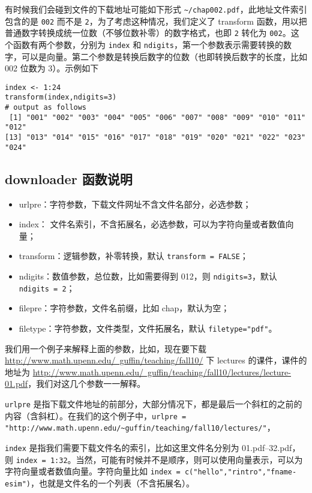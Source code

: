 \documentclass{article}
\begin{document}
有时候我们会碰到文件的下载地址可能如下形式 \lstinline{~/chap002.pdf}，此地址文件索引包含的是 \lstinline{002} 而不是 \lstinline{2}，为了考虑这种情况，我们定义了 \textsf{transform} 函数，用以把普通数字转换成统一位数（不够位数补零）的数字格式，也即 \lstinline{2} 转化为 \lstinline{002}。这个函数有两个参数，分别为 \lstinline{index} 和 \lstinline{ndigits}，第一个参数表示需要转换的数字，可以是向量。第二个参数是转换后数字的位数（也即转换后数字的长度，比如 002 位数为 3）。示例如下
\begin{lstlisting}
index <- 1:24
transform(index,ndigits=3)
# output as follows
 [1] "001" "002" "003" "004" "005" "006" "007" "008" "009" "010" "011" "012"
[13] "013" "014" "015" "016" "017" "018" "019" "020" "021" "022" "023" "024"
\end{lstlisting}

\subsection{downloader 函数说明}
\begin{itemize}
    \item urlpre：字符参数，下载文件网址不含文件名部分，必选参数；
    \item index： 文件名索引，不含拓展名，必选参数，可以为字符向量或者数值向量；
    \item transform：逻辑参数，补零转换，默认 \lstinline{transform = FALSE}；
    \item ndigits：数值参数，总位数，比如需要得到 012，则 \lstinline{ndigits=3}，默认 \lstinline{ndigits = 2}；
    \item filepre：字符参数，文件名前缀，比如 chap，默认为空；
    \item filetype：字符参数，文件类型，文件拓展名，默认 \lstinline{filetype="pdf"}。
\end{itemize}

我们用一个例子来解释上面的参数，比如，现在要下载 \href{http://www.math.upenn.edu/~guffin/teaching/fall10/}{http://www.math.upenn.edu/~guffin/teaching/fall10/} 下 lectures 的课件，课件的地址为 \href{http://www.math.upenn.edu/~guffin/teaching/fall10/lectures/lecture-01.pdf}{http://www.math.upenn.edu/~guffin/teaching/fall10/lectures/lecture-01.pdf}，我们对这几个参数一一解释。

\lstinline{urlpre} 是指下载文件地址的前部分，大部分情况下，都是最后一个斜杠的之前的内容（含斜杠）。在我们的这个例子中，\lstinline{urlpre = "http://www.math.upenn.edu/~guffin/teaching/fall10/lectures/"}，

\lstinline{index} 是指我们需要下载文件名的索引，比如这里文件名分别为 01.pdf--32.pdf，则 \lstinline{index = 1:32}。当然，可能有时候并不是顺序，则可以使用向量表示，可以为字符向量或者数值向量。字符向量比如 \lstinline{index = c("hello","rintro","fname-esim")}，也就是文件名的一个列表（不含拓展名）。
\end{document}
